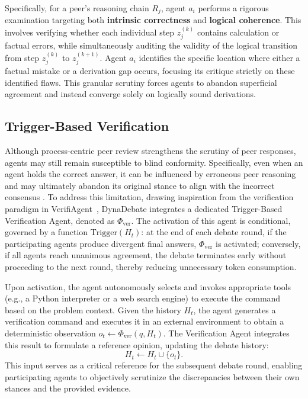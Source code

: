 Specifically, for a peer's reasoning chain $R_j$, agent $a_i$ performs a rigorous examination targeting both \textbf{intrinsic correctness} and \textbf{logical coherence}. This involves verifying whether each individual step $z_j^{(k)}$ contains calculation or factual errors, while simultaneously auditing the validity of the logical transition from step $z_j^{(k)}$ to $z_j^{(k+1)}$. Agent $a_i$ identifies the specific location where either a factual mistake or a derivation gap occurs, focusing its critique strictly on these identified flaws. This granular scrutiny forces agents to abandon superficial agreement and instead converge solely on logically sound derivations.

\subsection{Trigger-Based Verification }
\label{sec:verification}

Although process-centric peer review strengthens the scrutiny of peer responses, agents may still remain susceptible to blind conformity. Specifically, even when an agent holds the correct answer, it can be influenced by erroneous peer reasoning and may ultimately abandon its original stance to align with the incorrect consensus \cite{wynn2025talk}. To address this limitation, drawing inspiration from the verification paradigm in VerifiAgent~\cite{han2025verifiagent}, DynaDebate integrates a dedicated Trigger-Based Verification Agent, denoted as $\Phi_{\text{ver}}$. The activation of this agent is conditional, governed by a function $\text{Trigger}(H_t)$: at the end of each debate round, if the participating agents produce divergent final answers, $\Phi_{\text{ver}}$ is activated; conversely, if all agents reach unanimous agreement, the debate terminates early without proceeding to the next round, thereby reducing unnecessary token consumption.

Upon activation, the agent autonomously selects and invokes appropriate tools (e.g., a Python interpreter or a web search engine) to execute the command based on the problem context. Given the history $H_t$, the agent generates a verification command and executes it in an external environment to obtain a deterministic observation $o_t \leftarrow \Phi_{\text{ver}}(q, H_t)$. The Verification Agent integrates this result to formulate a reference opinion, updating the debate history:
\begin{equation}
    H_t \leftarrow H_t \cup \{o_t\}.
\end{equation}
This input serves as a critical reference for the subsequent debate round, enabling participating agents to objectively scrutinize the discrepancies between their own stances and the provided evidence.
